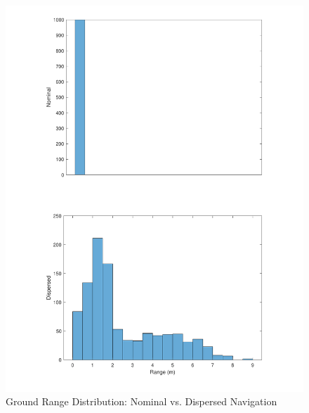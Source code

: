 \begin{figure}[H]
	\centering
	\begin{minipage}{4.3 in}
		\includegraphics[width=\linewidth]{Figures/hrngnavvsnonav.pdf}
		\caption{Ground Range Distribution: Nominal vs. Dispersed Navigation \label{fig:hrngnavvsnonav} }
	\end{minipage}
\end{figure}



